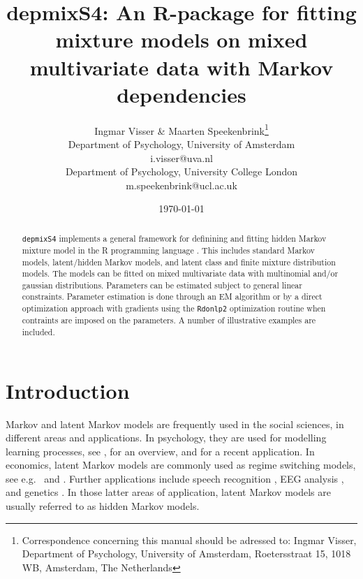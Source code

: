 \documentclass[a4paper]{article}
\title{depmixS4: An R-package for fitting mixture models on mixed
multivariate data with Markov dependencies}
\author{Ingmar Visser \& Maarten Speekenbrink\thanks{
Correspondence concerning this manual should be adressed to:
Ingmar Visser, Department of Psychology, University of Amsterdam,
Roetersstraat 15, 1018 WB, Amsterdam, The Netherlands}\\
Department of Psychology, University of Amsterdam\\
i.visser@uva.nl \\ 
Department of Psychology, University College London 
\\ m.speekenbrink@ucl.ac.uk}
\date{\today}
\newcommand{\pkg}{\texttt}
\newcommand{\code}{\texttt}
\begin{document}


\maketitle

\begin{abstract} 
	
	\pkg{depmixS4} implements a general framework for definining and
	fitting hidden Markov mixture model in the R programming language
	\citep{R2007}.  This includes standard Markov models,
	latent/hidden Markov models, and latent class and finite mixture
	distribution models.  The models can be fitted on mixed
	multivariate data with multinomial and/or gaussian distributions.
	Parameters can be estimated subject to general linear constraints.
	Parameter estimation is done through an EM algorithm or by a
	direct optimization approach with gradients using the
	\code{Rdonlp2} optimization routine when contraints are imposed on
	the parameters.  A number of illustrative examples are included.

\end{abstract}

\newpage
\tableofcontents
\newpage

\section{Introduction}

Markov and latent Markov models are frequently used in the social
sciences, in different areas and applications.  In psychology, they
are used for modelling learning processes, see \citet{Wickens1982},
for an overview, and \citet{Schmittmann2006} for a recent application.
In economics, latent Markov models are commonly used as regime
switching models, see e.g.\ \citet{Kim1994} and \citet{Ghysels1994}.
Further applications include speech recognition \citep{Rabiner1989},
EEG analysis \citep{Rainer2000}, and genetics \citep{Krogh1998}.  In
those latter areas of application, latent Markov models are usually
referred to as hidden Markov models.
\end{document}
